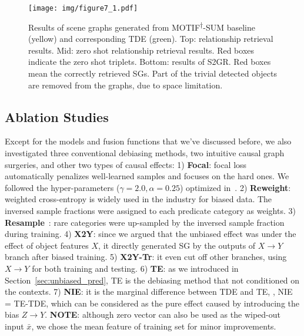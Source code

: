 \documentclass[10pt,twocolumn,letterpaper]{article}
\begin{document}
\begin{figure*}
   \begin{minipage}[b]{1.0\linewidth}
   \centerline{\texttt{[image: img/figure7\_1.pdf]}}
   \end{minipage}
   \caption{ Results of scene graphs generated from MOTIF\textsuperscript{$\dagger$}-SUM baseline (yellow) and corresponding TDE (green). Top: relationship retrieval results. Mid: zero shot relationship retrieval results. Red boxes indicate the zero shot triplets. Bottom: results of S2GR. Red boxes mean the correctly retrieved SGs. Part of the trivial detected objects are removed from the graphs, due to space limitation.}
   \label{fig:7} \vspace{-0.2in}
\end{figure*}

\vspace{-0.05in}
\subsection{Ablation Studies}
\vspace{-0.05in}
Except for the models and fusion functions that we've discussed before, we also investigated three conventional debiasing methods, two intuitive causal graph surgeries, and other two types of causal effects: 1) \textbf{Focal}: focal loss~\cite{lin2017focal} automatically penalizes well-learned samples and focuses on the hard ones. We followed the  hyper-parameters ($\gamma=2.0, \alpha=0.25$) optimized in~\cite{lin2017focal}. 2) \textbf{Reweight}: weighted cross-entropy is widely used in the industry for biased data. The inversed sample fractions were assigned to each predicate category as weights. 3) \textbf{Resample}~\cite{burnaev2015influence}: rare categories were up-sampled by the inversed sample fraction during training. 4) \textbf{X2Y}: since we argued that the unbiased effect was under the effect of object features $X$, it directly generated SG by the outputs of $X\to Y$ branch after biased training. 5) \textbf{X2Y-Tr}: it even cut off other branches, using $X\to Y$ for both training and testing. 6) \textbf{TE}: as we introduced in Section~\ref{sec:unbiased_pred}, TE is the debiasing method that not conditioned on the contexts. 7) \textbf{NIE}: it is the marginal difference between TDE and TE, \ie, NIE = TE-TDE, which can be considered as the pure effect caused by introducing the bias $Z\to Y$. \textbf{NOTE}: although zero vector can also be used as the wiped-out input $\bar{x}$, we chose the mean feature of training set for minor improvements.
\end{document}
